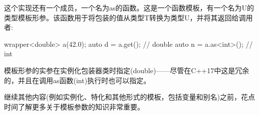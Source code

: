 这个实现还有一个成员，一个名为as的函数。这是一个函数模板，有一个名为U的类型模板形参。该函数用于将包装的值从类型T转换为类型U，并将其返回给调用者:


\begin{cpp}
wrapper<double> a(42.0);
auto d = a.get(); // double
auto n = a.as<int>(); // int
\end{cpp}

模板形参的实参在实例化包装器类时指定(double)——尽管在C++17中这是冗余的，并且在调用as函数(int)执行时也可以指定。

继续其他内容(例如实例化、特化和其他形式的模板，包括变量和别名)之前，花点时间了解更多关于模板参数的知识非常重要。







